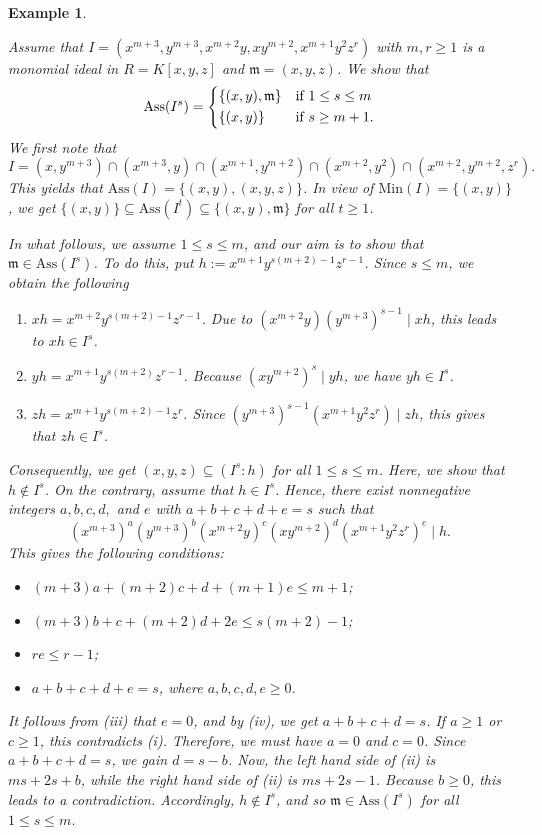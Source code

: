 \documentclass[11pt]{amsart}
\newtheorem{example}[theorem]{Example}
\begin{document}
\begin{example} \label{Ex.Ass.PandN}
\em{
Assume that  $I=(x^{m+3}, y^{m+3}, x^{m+2}y, xy^{m+2}, x^{m+1}y^{2}z^r)$ with $m, r\geq 1$  is  a monomial ideal in  $R=K[x,y,z]$ and 
$\mathfrak{m}=(x,y,z)$.   We show  that 
\[
\mathrm{Ass}(I^s) =
    \begin{dcases}
    \{(x,y), \mathfrak{m}\} & \text{if } 1\leq s\leq m\\
\{(x,y)\}  & \text{if } s\geq m+1. \\
                \end{dcases}
\]
We first note that  $$I=(x, y^{m+3}) \cap (x^{m+3}, y) \cap (x^{m+1}, y^{m+2}) \cap (x^{m+2}, y^2) \cap (x^{m+2}, y^{m+2}, z^r).$$
This yields that $\mathrm{Ass}(I)=\{(x,y), (x,y,z)\}$. In view of  $\mathrm{Min}(I)=\{(x,y)\}$, 
we get  $ \{(x,y)\} \subseteq   \mathrm{Ass}(I^t) \subseteq \{(x,y), \mathfrak{m}\}$ for all $t\geq 1$. 




 In what follows, we assume  $1\leq s\leq m$, and our aim is to show that $\mathfrak{m} \in \mathrm{Ass}(I^s)$. To  do this, put $h:=x^{m+1}y^{s(m+2)-1}z^{r-1}$. Since $s\leq m$,  we obtain the following 
  \begin{enumerate}
  \item $xh= x^{m+2}y^{s(m+2)-1}z^{r-1}$. Due to   $(x^{m+2}y)(y^{m+3})^{s-1}\mid xh$, this leads to  $xh\in I^s$. 
  \item $yh=x^{m+1}y^{s(m+2)}z^{r-1}$. Because  $(xy^{m+2})^s \mid yh$, we have  $yh\in I^s$. 
  \item  $zh=x^{m+1}y^{s(m+2)-1}z^r$. Since $(y^{m+3})^{s-1}(x^{m+1}y^2z^r) \mid zh$, this gives that  $zh\in I^s$. 
  \end{enumerate}

Consequently, we get $(x,y,z) \subseteq (I^s:h)$ for all $1\leq s \leq m$. Here, we show that $h\notin I^s$. On the contrary, assume that $h\in I^s$. Hence, there exist nonnegative integers $a,b,c, d,$ and $e$ with $a+b+c+d+e=s$ such that 
$$(x^{m+3})^a (y^{m+3})^b (x^{m+2}y)^c (xy^{m+2})^d (x^{m+1}y^2z^r)^e \mid h.$$
This gives the following conditions:
\begin{itemize}
\item[(i)] $(m+3)a+ (m+2)c + d + (m+1)e \leq m+1$;
\item[(ii)] $(m+3)b+c+(m+2)d+2e \leq s(m+2)-1$;
\item[(iii)] $re \leq r-1$;
\item[(iv)] $a+b+c+d+e=s$, where $a,b,c,d,e \geq 0$. 
\end{itemize}
It follows from (iii) that $e=0$, and by (iv), we get $a+b+c+d=s$. If $a\geq 1$ or $c\geq 1$, this contradicts (i). Therefore, we must have $a=0$ and $c=0$. 
Since $a+b+c+d=s$, we gain $d=s-b$. Now, the left hand side of (ii) is $ms+2s+b$, while the right hand side of (ii) is $ms+2s-1$. Because $b \geq 0$, this 
leads to a contradiction. Accordingly, $h\notin I^s$, and so   $\mathfrak{m} \in \mathrm{Ass}(I^s)$  for all $1\leq s \leq m$. 

}
\end{example}
\end{document}
